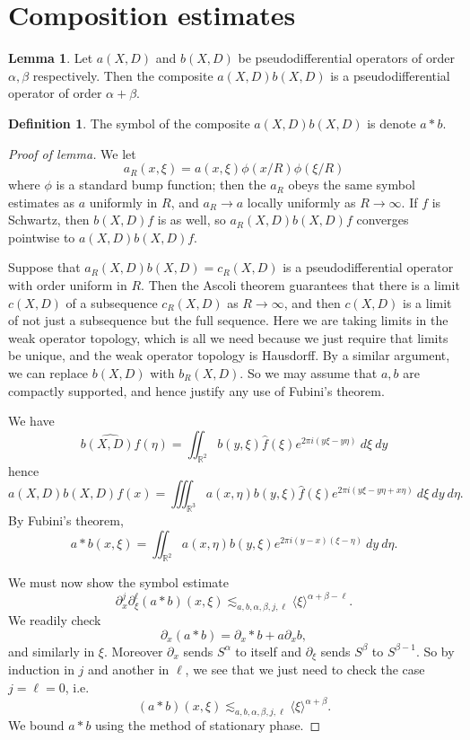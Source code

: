 \documentclass[12pt]{report}
\newcommand{\RR}{\mathbb{R}}
\theoremstyle{definition}
\newtheorem{lemma}[theorem]{Lemma}
\newtheorem{definition}[theorem]{Definition}
\begin{document}
\section{Composition estimates}
\begin{lemma}
Let $a(X, D)$ and $b(X, D)$ be pseudodifferential operators of order $\alpha,\beta$ respectively. Then the composite $a(X,D)b(X,D)$ is a pseudodifferential operator of order $\alpha + \beta$.
\end{lemma}
\begin{definition}
The symbol of the composite $a(X,D)b(X,D)$ is denote $a*b$.
\end{definition}
\begin{proof}[Proof of lemma]
We let
$$a_R(x, \xi) = a(x, \xi)\phi(x/R)\phi(\xi/R)$$
where $\phi$ is a standard bump function; then the $a_R$ obeys the same symbol estimates as $a$ uniformly in $R$, and $a_R \to a$ locally uniformly as $R \to \infty$.
If $f$ is Schwartz, then $b(X,D)f$ is as well, so $a_R(X, D) b(X, D)f$ converges pointwise to $a(X, D)b(X, D)f$.

Suppose that $a_R(X, D) b(X, D) = c_R(X, D)$ is a pseudodifferential operator with order uniform in $R$.
Then the Ascoli theorem guarantees that there is a limit $c(X, D)$ of a subsequence $c_R(X, D)$ as $R \to \infty$, and then $c(X, D)$ is a limit of not just a subsequence but the full sequence. Here we are taking limits in the weak operator topology, which is all we need because we just require that limits be unique, and the weak operator topology is Hausdorff.
By a similar argument, we can replace $b(X, D)$ with $b_R(X, D)$. So we may assume that $a,b$ are compactly supported, and hence justify any use of Fubini's theorem.

We have
$$\widehat{b(X,D)f}(\eta) = \iint_{\RR^2} b(y, \xi)\hat f(\xi)e^{2\pi i(y\xi-y\eta)} ~d\xi~dy$$
hence
$$a(X,D)b(X,D)f(x) = \iiint_{\RR^3} a(x,\eta)b(y,\xi)\hat f(\xi)e^{2\pi i(y\xi-y\eta+x\eta)}~d\xi~dy~d\eta.$$
By Fubini's theorem,
$$a*b(x,\xi) = \iint_{\RR^2} a(x,\eta)b(y,\xi)e^{2\pi i(y-x)(\xi-\eta)}~dy~d\eta.$$

We must now show the symbol estimate
$$\partial_x^j \partial_\xi^\ell (a*b)(x, \xi) \lesssim_{a,b,\alpha,\beta,j,\ell} \langle \xi\rangle^{\alpha + \beta - \ell}.$$
We readily check
$$\partial_x(a*b) = \partial_x * b + a \partial_x b,$$
and similarly in $\xi$. Moreover $\partial_x$ sends $S^\alpha$ to itself and $\partial_\xi$ sends $S^\beta$ to $S^{\beta - 1}$.
So by induction in $j$ and another in $\ell$, we see that we just need to check the case $j = \ell = 0$, i.e.
$$(a*b)(x, \xi) \lesssim_{a,b,\alpha,\beta,j,\ell} \langle \xi \rangle^{\alpha + \beta}.$$
We bound $a*b$ using the method of stationary phase.


\end{proof}
\end{document}
